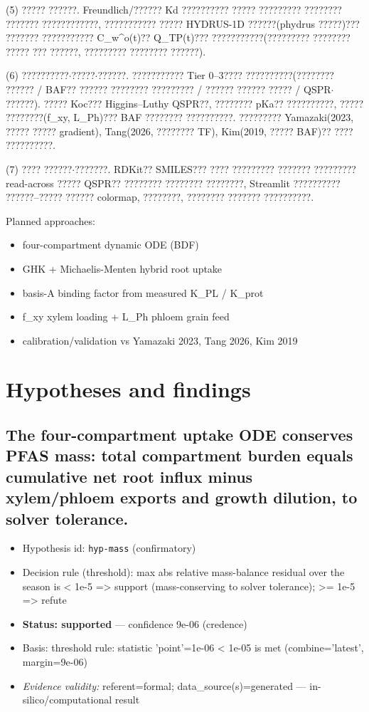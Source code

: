 \documentclass{article}
\begin{document}
(5) ????? ??????. Freundlich/?????? Kd ?????????? ????? ????????? ???????? ??????? ????????????,
??????????? ????? HYDRUS-1D ??????(phydrus ?????)??? ??????? ??????????? C\_w\textasciicircum{}o(t)?? Q\_TP(t)???
???????????(????????? ???????? ????? ??? ??????, ????????? ???????? ??????).

(6) ??????????$\cdot$?????$\cdot$??????. ??????????? Tier 0--3???? ??????????(???????? ?????? / BAF??
?????? ???????? ????????? / ?????? ?????? ????? / QSPR$\cdot$??????). ????? Koc??? Higgins--Luthy
QSPR??, ???????? pKa?? ??????????, ????? ????????(f\_xy, L\_Ph)??? BAF ???????? ??????????.
????????? Yamazaki(2023, ????? ????? gradient), Tang(2026, ???????? TF), Kim(2019, ?????
BAF)?? ???? ??????????.

(7) ???? ??????$\cdot$???????. RDKit?? SMILES??? ???? ????????? ??????? ????????? read-across
????? QSPR?? ???????? ???????? ????????, Streamlit ?????????? ??????--????? ?????? colormap,
????????, ???????? ??????? ??????????.

Planned approaches:
\begin{itemize}
  \item four-compartment dynamic ODE (BDF)
  \item GHK + Michaelis-Menten hybrid root uptake
  \item basis-A binding factor from measured K\_PL / K\_prot
  \item f\_xy xylem loading + L\_Ph phloem grain feed
  \item calibration/validation vs Yamazaki 2023, Tang 2026, Kim 2019
\end{itemize}

\section{Hypotheses and findings}

\subsection{The four-compartment uptake ODE conserves PFAS mass: total compartment burden equals cumulative net root influx minus xylem/phloem exports and growth dilution, to solver tolerance.}
\begin{itemize}
  \item Hypothesis id: \texttt{hyp-mass} (confirmatory)
  \item Decision rule (threshold): max abs relative mass-balance residual over the season is < 1e-5 => support (mass-conserving to solver tolerance); >= 1e-5 => refute
  \item \textbf{Status: supported} --- confidence 9e-06 (credence)
  \item Basis: threshold rule: statistic 'point'=1e-06 < 1e-05 is met (combine='latest', margin=9e-06)
  \item \textit{Evidence validity:} referent=formal; data\_source(s)=generated --- in-silico/computational result
\end{itemize}
\end{document}
